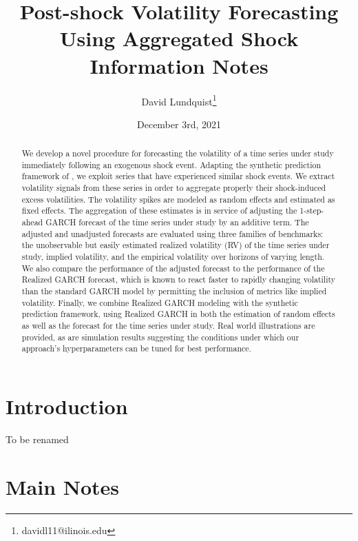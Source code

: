 \documentclass[11pt]{article}
\title{Post-shock Volatility Forecasting Using Aggregated Shock Information Notes}
\author{David Lundquist\thanks{davidl11@ilinois.edu} }
\affil{Department of Statistics, University of Illinois at Urbana-Champaign}
\date{December 3rd, 2021}
\theoremstyle{definition}
\begin{document}
\maketitle

\begin{abstract}
We develop a novel procedure for forecasting the volatility of a time series under study immediately following an exogenous shock event.  Adapting the synthetic prediction framework of \citet{lin2021minimizing}, we exploit series that have experienced similar shock events.  We extract volatility signals from these series in order to aggregate properly their shock-induced excess volatilities.  The volatility spikes are modeled as random effects and estimated as fixed effects.  The aggregation of these estimates is in service of adjusting the 1-step-ahead GARCH forecast of the time series under study by an additive term.  The adjusted and unadjusted forecasts are evaluated using three families of benchmarks: the unobservable but easily estimated realized volatility (RV) of the time series under study, implied volatility, and the empirical volatility over horizons of varying length.  We also compare the performance of the adjusted forecast to the performance of the Realized GARCH forecast, which is known to react faster to rapidly changing volatility than the standard GARCH model by permitting the inclusion of metrics like implied volatility.   Finally, we combine Realized GARCH modeling with the synthetic prediction framework, using Realized GARCH in both the estimation of random effects as well as the forecast for the time series under study.  Real world illustrations are provided, as are simulation results suggesting the conditions under which our approach's hyperparameters can be tuned for best performance.
\end{abstract}


\section{Introduction}

To be renamed


\section{Main Notes}

\label{section2}
\end{document}
